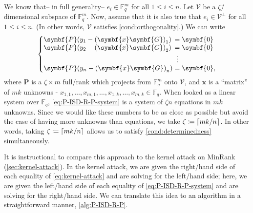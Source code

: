 \documentclass[version=last, paper=A4, parskip=half, oneside,%
toc=bibliography, toc=listof, listof=leveldown]{scrbook}
\theoremstyle{plain}
\theoremstyle{definition}
\theoremstyle{remark}
\renewcommand*{\vec}{\symbf}
\newcommand*{\mat}{\symbf}
\newcommand*{\FF}{\ensuremath{\mathbb{F}}}
\DeclarePairedDelimiter{\ceil}{\lceil}{\rceil}
\begin{document}
We know that\--- in full generality\--- \(e_i \in \FF_q^m\) for all
\(1 \le i \le n\).  Let \(\mathcal{V}\) be a \(\zeta\)\=/dimensional subspace
of \(\FF_q^m\).  Now, assume that it is also true that
\(e_i \in \mathcal{V}^{\perp}\) for all \(1 \le i \le n\).  (In other words,
\(\mathcal{V}\) satisfies \cref{cond:orthogonality}.)  We can write
\begin{equation}\label{eq:P-ISD-R-P-system}
  \setlength{\arraycolsep}{0pt}
  \newcolumntype{B}{>{{}}c<{{}}}
  \left\{
    \begin{array}{l B l}
      \mat{P} (y_1 - {(\vec{x} \mat{G})}_1) & = & \vec{0} \\
      \mat{P} (y_2 - {(\vec{x} \mat{G})}_2) & = & \vec{0} \\
                                            & \vdots & \\
      \mat{P} (y_n - {(\vec{x} \mat{G})}_n) & = & \vec{0}\text,
    \end{array}
  \right.
\end{equation}
where \(\mat{P}\) is a \(\zeta \times m\) full\-/rank which projects from
\(\FF_q^m\) onto \(\mathcal{V}\), and \(\vec{x}\) is a \enquote{matrix} of
\(m k\) unknowns \--{}
\(x_{1, 1}, \ldots, x_{m, 1}, \ldots, x_{1, k}, \ldots, x_{m, k} \in \FF_{q}\).
When looked as a linear system over \(\FF_q\), \cref{eq:P-ISD-R-P-system} is a
system of \(\zeta n\) equations in \(m k\) unknowns.  Since we would like these
numbers to be as close as possible but avoid the case of having more unknowns
than equations, we take \(\zeta \coloneqq \ceil{m k / {n}}\).  In other words,
taking \(\zeta \coloneqq \ceil{m k / {n}}\) allows us to satisfy
\cref{cond:determinedness} simultaneously.

It is instructional to compare this approach to the kernel attack on MinRank
(\cref{sec:kernel-attack}).  In the kernel attack, we are given the
right\-/hand side of each equality of \cref{eq:kernel-attack} and are solving
for the left\-/hand side; here, we are given the left\-/hand side of each
equality of \cref{eq:P-ISD-R-P-system} and are solving for the right\-/hand
side.  We can translate this idea to an algorithm in a straightforward manner,
\cref{alg:P-ISD-R-P}.
\end{document}
